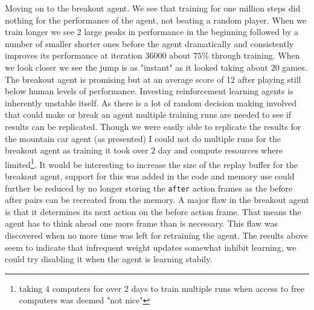 Moving on to the breakout agent. We see that training for one million steps did nothing for the performance of the agent, not beating a random player. When we train longer we see 2 large peaks in performance in the beginning followed by a number of smaller shorter ones before the agent dramatically and consistently improves its performance at iteration $36000$ about $75$\% through training. When we look closer we see the jump is as "instant" as it looked taking about $20$ games. The breakout agent is promising but at an average score of 12 after playing still below human levels of performance.
%
Investing reinforcement learning agents is inherently unstable itself. As there is a lot of random decision making involved that could make or break an agent multiple training runs are needed to see if results can be replicated. Though we were easily able to replicate the results for the mountain car agent (as presented) I could not do multiple runs for the breakout agent as training it took over $2$ day and compute resources where limited\footnote{taking 4 computers for over 2 days to train multiple runs when access to free computers was deemed "not nice"}.
%
It would be interesting to increase the size of the replay buffer for the breakout agent, support for this was added in the code and memory use could further be reduced by no longer storing the \texttt{after} action frames as the before after pairs can be recreated from the memory. A major flaw in the breakout agent is that it determines its next action on the before action frame. That means the agent has to think ahead one more frame than is necessary. This flaw was discovered when no more time was left for retraining the agent. The results above seem to indicate that infrequent weight updates somewhat inhibit learning, we could try disabling it when the agent is learning stabily. 